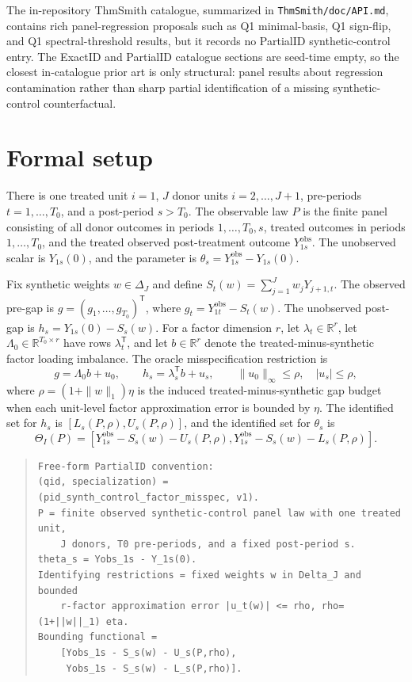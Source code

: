 \documentclass[11pt]{article}
\newcommand{\transpose}{\mathsf{T}}
\newcommand{\R}{\mathbb{R}}
\theoremstyle{definition}
\theoremstyle{plain}
\theoremstyle{remark}
\begin{document}
The in-repository ThmSmith catalogue, summarized in \texttt{ThmSmith/doc/API.md}, contains rich panel-regression proposals such as Q1 minimal-basis, Q1 sign-flip, and Q1 spectral-threshold results, but it records no PartialID synthetic-control entry. The ExactID and PartialID catalogue sections are seed-time empty, so the closest in-catalogue prior art is only structural: panel results about regression contamination rather than sharp partial identification of a missing synthetic-control counterfactual.

\section{Formal setup}
There is one treated unit \(i=1\), \(J\) donor units \(i=2,\ldots,J+1\), pre-periods \(t=1,\ldots,T_0\), and a post-period \(s>T_0\). The observable law \(P\) is the finite panel consisting of all donor outcomes in periods \(1,\ldots,T_0,s\), treated outcomes in periods \(1,\ldots,T_0\), and the treated observed post-treatment outcome \(Y^{\mathrm{obs}}_{1s}\). The unobserved scalar is \(Y_{1s}(0)\), and the parameter is \(\theta_s=Y^{\mathrm{obs}}_{1s}-Y_{1s}(0)\).

Fix synthetic weights \(w\in\Delta_J\) and define \(S_t(w)=\sum_{j=1}^Jw_jY_{j+1,t}\). The observed pre-gap is \(g=(g_1,\ldots,g_{T_0})^\transpose\), where \(g_t=Y^{\mathrm{obs}}_{1t}-S_t(w)\). The unobserved post-gap is \(h_s=Y_{1s}(0)-S_s(w)\). For a factor dimension \(r\), let \(\lambda_t\in\R^r\), let \(\Lambda_0\in\R^{T_0\times r}\) have rows \(\lambda_t^\transpose\), and let \(b\in\R^r\) denote the treated-minus-synthetic factor loading imbalance. The oracle misspecification restriction is
\[
g=\Lambda_0b+u_0,\qquad h_s=\lambda_s^\transpose b+u_s,\qquad
\|u_0\|_\infty\le\rho,\quad |u_s|\le\rho,
\]
where \(\rho=(1+\|w\|_1)\eta\) is the induced treated-minus-synthetic gap budget when each unit-level factor approximation error is bounded by \(\eta\). The identified set for \(h_s\) is \([L_s(P,\rho),U_s(P,\rho)]\), and the identified set for \(\theta_s\) is
\[
\Theta_I(P)=
[Y^{\mathrm{obs}}_{1s}-S_s(w)-U_s(P,\rho),
Y^{\mathrm{obs}}_{1s}-S_s(w)-L_s(P,\rho)].
\]

\begin{quote}
\begin{verbatim}
Free-form PartialID convention:
(qid, specialization) =
(pid_synth_control_factor_misspec, v1).
P = finite observed synthetic-control panel law with one treated unit,
    J donors, T0 pre-periods, and a fixed post-period s.
theta_s = Yobs_1s - Y_1s(0).
Identifying restrictions = fixed weights w in Delta_J and bounded
    r-factor approximation error |u_t(w)| <= rho, rho=(1+||w||_1) eta.
Bounding functional =
    [Yobs_1s - S_s(w) - U_s(P,rho),
     Yobs_1s - S_s(w) - L_s(P,rho)].
\end{verbatim}
\end{quote}
\end{document}
